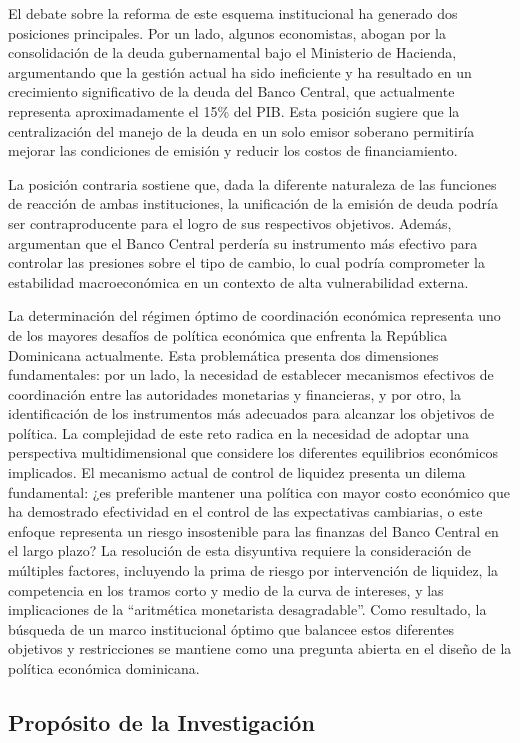 \documentclass[
  authoryear,
  review]{elsarticle}
\begin{document}
El debate sobre la reforma de este esquema institucional ha generado dos
posiciones principales. Por un lado, algunos economistas, abogan por la
consolidación de la deuda gubernamental bajo el Ministerio de Hacienda,
argumentando que la gestión actual ha sido ineficiente y ha resultado en
un crecimiento significativo de la deuda del Banco Central, que
actualmente representa aproximadamente el 15\% del PIB. Esta posición
sugiere que la centralización del manejo de la deuda en un solo emisor
soberano permitiría mejorar las condiciones de emisión y reducir los
costos de financiamiento.

La posición contraria sostiene que, dada la diferente naturaleza de las
funciones de reacción de ambas instituciones, la unificación de la
emisión de deuda podría ser contraproducente para el logro de sus
respectivos objetivos. Además, argumentan que el Banco Central perdería
su instrumento más efectivo para controlar las presiones sobre el tipo
de cambio, lo cual podría comprometer la estabilidad macroeconómica en
un contexto de alta vulnerabilidad externa.

La determinación del régimen óptimo de coordinación económica representa
uno de los mayores desafíos de política económica que enfrenta la
República Dominicana actualmente. Esta problemática presenta dos
dimensiones fundamentales: por un lado, la necesidad de establecer
mecanismos efectivos de coordinación entre las autoridades monetarias y
financieras, y por otro, la identificación de los instrumentos más
adecuados para alcanzar los objetivos de política. La complejidad de
este reto radica en la necesidad de adoptar una perspectiva
multidimensional que considere los diferentes equilibrios económicos
implicados. El mecanismo actual de control de liquidez presenta un
dilema fundamental: ¿es preferible mantener una política con mayor costo
económico que ha demostrado efectividad en el control de las
expectativas cambiarias, o este enfoque representa un riesgo
insostenible para las finanzas del Banco Central en el largo plazo? La
resolución de esta disyuntiva requiere la consideración de múltiples
factores, incluyendo la prima de riesgo por intervención de liquidez, la
competencia en los tramos corto y medio de la curva de intereses, y las
implicaciones de la ``aritmética monetarista desagradable''. Como
resultado, la búsqueda de un marco institucional óptimo que balancee
estos diferentes objetivos y restricciones se mantiene como una pregunta
abierta en el diseño de la política económica dominicana.

\subsection{Propósito de la
Investigación}\label{propuxf3sito-de-la-investigaciuxf3n}
\end{document}
